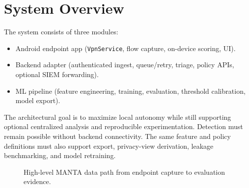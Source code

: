 \section{System Overview}
The system consists of three modules:
\begin{itemize}[leftmargin=*]
  \item Android endpoint app (\texttt{VpnService}, flow capture, on-device scoring, UI).
  \item Backend adapter (authenticated ingest, queue/retry, triage, policy APIs, optional SIEM forwarding).
  \item ML pipeline (feature engineering, training, evaluation, threshold calibration, model export).
\end{itemize}
The architectural goal is to maximize local autonomy while still supporting optional centralized
analysis and reproducible experimentation. Detection must remain possible without backend
connectivity. The same feature and policy definitions must also support export, privacy-view
derivation, leakage benchmarking, and model retraining.

\begin{figure}[htbp]
  \centering
  \caption{High-level MANTA data path from endpoint capture to evaluation evidence.}
  \label{fig:manta-architecture}
\end{figure}


